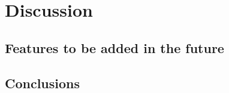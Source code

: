 \chapter{Discussion}
\label{chapter4}

\section{Features to be added in the future}
\label{futureDevelopment}

\section{Conclusions}